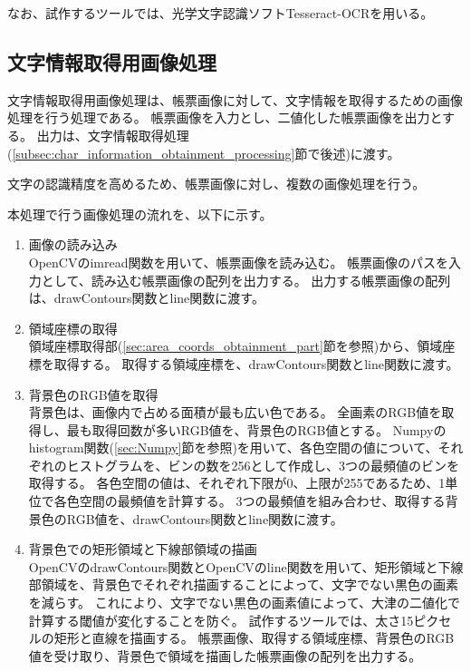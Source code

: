 なお、試作するツールでは、光学文字認識ソフトTesseract-OCR\cite{Tesseract-OCR}を用いる。

\subsection{文字情報取得用画像処理}\label{subsec:image_processing_for_char_recognition}
文字情報取得用画像処理は、帳票画像に対して、文字情報を取得するための画像処理を行う処理である。
帳票画像を入力とし、二値化した帳票画像を出力とする。
出力は、文字情報取得処理(\ref{subsec:char_information_obtainment_processing}節で後述)に渡す。

文字の認識精度を高めるため、帳票画像に対し、複数の画像処理を行う。

本処理で行う画像処理の流れを、以下に示す。

\begin{enumerate}
    \item 画像の読み込み\\
        OpenCVのimread関数を用いて、帳票画像を読み込む。
        帳票画像のパスを入力として、読み込む帳票画像の配列を出力する。
        出力する帳票画像の配列は、drawContours関数とline関数に渡す。
    \item 領域座標の取得\\
        領域座標取得部(\ref{sec:area_coords_obtainment_part}節を参照)から、領域座標を取得する。
        取得する領域座標を、drawContours関数とline関数に渡す。
    \item 背景色のRGB値を取得\label{enum:background_RGB}\\
        背景色は、画像内で占める面積が最も広い色である。
        全画素のRGB値を取得し、最も取得回数が多いRGB値を、背景色のRGB値とする。
        Numpyのhistogram関数(\ref{sec:Numpy}節を参照)を用いて、各色空間の値について、それぞれのヒストグラムを、ビンの数を256として作成し、3つの最頻値のビンを取得する。
        各色空間の値は、それぞれ下限が0、上限が255であるため、1単位で各色空間の最頻値を計算する。
        3つの最頻値を組み合わせ、取得する背景色のRGB値を、drawContours関数とline関数に渡す。
    \item 背景色での矩形領域と下線部領域の描画\\
        OpenCVのdrawContours関数とOpenCVのline関数を用いて、矩形領域と下線部領域を、背景色でそれぞれ描画することによって、文字でない黒色の画素を減らす。
        これにより、文字でない黒色の画素値によって、大津の二値化で計算する閾値が変化することを防ぐ。
        試作するツールでは、太さ15ピクセルの矩形と直線を描画する。
        帳票画像、取得する領域座標、背景色のRGB値を受け取り、背景色で領域を描画した帳票画像の配列を出力する。

\end{enumerate}
